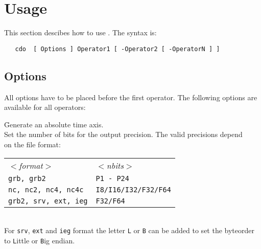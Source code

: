 \section{Usage}

This section descibes how to use {\CDO}.
The syntax is:
\begin{verbatim}
   cdo  [ Options ] Operator1 [ -Operator2 [ -OperatorN ] ]
\end{verbatim}


\subsection{Options}

All options have to be placed before the first operator.
The following options are available for all operators:

\begin{tabbing}
         \= Generate an absolute time axis. \\
         \> Set the number of bits for the output precision. The valid precisions depend \\
         \> on the file format:\\
         \> \parbox[r]{3in}{
              \vspace*{1mm}
              \hspace*{0cm}\begin{tabular}{|l|l|}
              \hline
              \rowcolor{pcolor2}
                \sl $<$format$>$ & \sl $<$nbits$>$ \\
                {\tt grb, grb2}           & {\tt P1 - P24}              \\
                {\tt nc, nc2, nc4, nc4c}  & {\tt I8/I16/I32/F32/F64}  \\
                {\tt grb2, srv, ext, ieg}       & {\tt F32/F64}             \\
              \hline
              \end{tabular}
              \vspace*{1mm}
            } \\
         \> For {\tt srv}, {\tt ext} and {\tt ieg} format the letter {\tt L} or {\tt B} can be added to set the byteorder \\
         \> to {\tt L}ittle or {\tt B}ig endian. \\

\end{tabbing}
